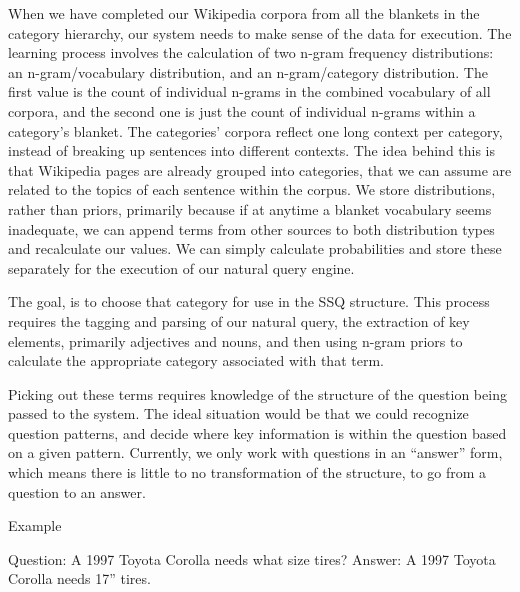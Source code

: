 
When we have completed our Wikipedia corpora from all the blankets in the category hierarchy, our system needs to make sense of the data for execution. The learning process involves the calculation of two n-gram frequency distributions: an n-gram/vocabulary distribution, and an n-gram/category distribution. The first value is the count of individual n-grams in the combined vocabulary of all corpora, and the second one is just the count of individual n-grams within a category’s blanket. The categories’ corpora reflect one long context per category, instead of breaking up sentences into different contexts. The idea behind this is that Wikipedia pages are already grouped into categories, that we can assume are related to the topics of each sentence within the corpus. We store distributions, rather than priors, primarily because if at anytime a blanket vocabulary seems inadequate, we can append terms from other sources to both distribution types and recalculate our values. We can simply calculate probabilities and store these separately for the execution of our natural query engine. 

The goal, is to choose that category for use in the SSQ structure. This process requires the tagging and parsing of our natural query, the extraction of key elements, primarily adjectives and nouns, and then using n-gram priors to calculate the appropriate category associated with that term. 

Picking out these terms requires knowledge of the structure of the question being passed to the system. The ideal situation would be that we could recognize question patterns, and decide where key information is within the question based on a given pattern. Currently, we only work with questions in an “answer” form, which means there is little to no transformation of the structure, to go from a question to an answer.

Example

Question: A 1997 Toyota Corolla needs what size tires?
Answer:   A 1997 Toyota Corolla needs 17” tires.
